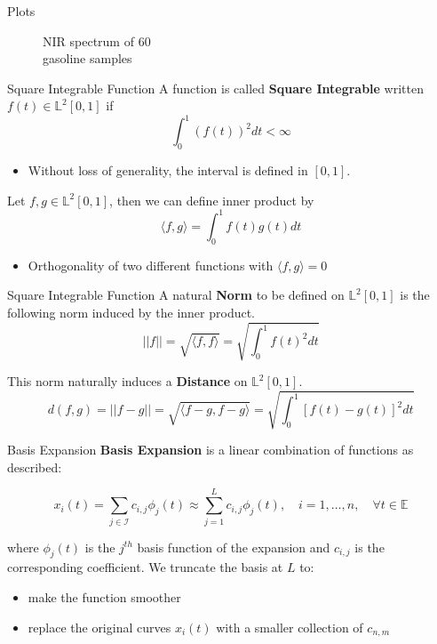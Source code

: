 \documentclass{beamer}
\begin{document}
\begin{frame}{Plots}
\begin{minipage}{.5\textwidth}
\begin{figure}
				\caption{NIR spectrum of 60 \\ gasoline samples}
			\end{figure}
		\end{minipage}
	\end{frame}
	
	\begin{frame}{Square Integrable Function}
		A function is called \textbf{Square Integrable} written $f(t) \in \mathbb{L}^{2}[0,1]$ if
		$$\int_{0}^{1} \left(f(t)\right)^{2}dt < \infty$$

		\begin{itemize}
			\item Without loss of generality, the interval is defined in $[0,1]$.
		\end{itemize}
		\vspace{0.2cm}
		
		Let $f, g \in \mathbb{L}^{2}[0,1]$, then we can define inner product by
		$$\langle f,g \rangle = \int_{0}^{1} f(t)g(t)dt$$
		
		\begin{itemize}
			\item Orthogonality of two different functions with $\langle f,g\rangle = 0$
		\end{itemize}
	\end{frame}
	
	\begin{frame}{Square Integrable Function}
		A natural \textbf{Norm} to be defined on $\mathbb{L}^2[0,1]$ is the following norm induced by the inner product.
		$$\vert\vert f \vert\vert = \sqrt{\langle f,f \rangle} = \sqrt{\int_{0}^{1} f(t)^2 dt}$$
		\vspace{0.2cm}
		
		This norm naturally induces a \textbf{Distance} on $\mathbb{L}^2[0,1]$.
		$$d(f,g) =  \vert\vert f - g \vert\vert= \sqrt{\langle f-g, f-g \rangle} = \sqrt{\int_{0}^{1} \left[f(t) - g(t)\right]^2 dt}$$
	
	\end{frame}
	
	\begin{frame}{Basis Expansion}
		\textbf{Basis Expansion} is a linear combination of functions as
		described:
		
		$$x_{i}(t) = \sum_{j \in \mathcal{I}} c_{i,j}\phi_{j}(t) \approx
		\sum_{j=1}^{L} c_{i, j}\phi_{j}(t), \quad i = 1, \dots, n, \quad \forall t \in
		\mathbb{E}$$
		
		where $\phi_{j}(t)$ is the $j^{th}$ basis function of the expansion
		and $c_{i, j}$ is the corresponding coefficient. We truncate the basis at $L$
		to:
		\vspace{0.2cm}
		
		\begin{itemize}
			\item make the function smoother
			\item replace the original curves $x_{i}(t)$ with a smaller
			collection of $c_{n, m}$
		\end{itemize}     
	\end{frame}
	
\end{document}
